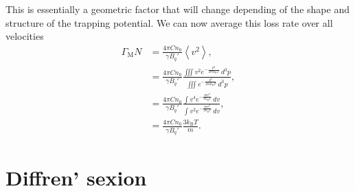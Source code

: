 This is essentially a geometric factor that will change depending of the shape and structure of the trapping potential.
We can now average this loss rate over all velocities
\begin{align}
    \Gamma_\textrm{M}N &= \frac{ 4\pi C n_0 } { \gamma B_q'} \left< v^2 \right>,\\
    &= \frac{ 4\pi C n_0 } { \gamma B_q'} \frac{ \iiint v^2 e^{-\frac{p^2}{2mk_\textrm{B}T}}\, d^3p}{\iiint e^{-\frac{p^2}{2mk_\textrm{B}T}}\,d^3p},\\
    &= \frac{ 4\pi C n_0 } { \gamma B_q'} \frac{ \int v^4 e^{-\frac{mv^2}{2k_\textrm{B}T}}\, dv}{\int v^2 e^{-\frac{mv^2}{2k_\textrm{B}T}}\,dv},\\
    &= \frac{ 4\pi C n_0 } { \gamma B_q'} \frac{3k_\textrm{B}T}{m}.
\end{align}


\section{Diffren' sexion} \label{sec:maj_loss_der}

